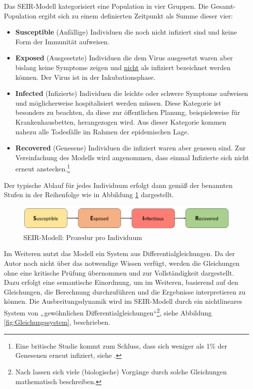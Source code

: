 \documentclass[12pt]{article}
\begin{document}
Das SEIR-Modell kategorisiert eine Population in vier Gruppen. Die Gesamt-Population ergibt sich zu einem definierten Zeitpunkt als Summe dieser vier:

\begin{itemize}
    \item \textbf{Susceptible} (Anfällige) Individuen die noch nicht infiziert sind und keine Form der Immunität aufweisen.
    \item \textbf{Exposed} (Ausgesetzte) Individuen die dem Virus ausgesetzt waren aber bislang keine Symptome zeigen und \underline{nicht} als infiziert bezeichnet werden können. Der Virus ist in der Inkubationsphase.
    \item \textbf{Infected} (Infizierte) Individuen die leichte oder schwere Symptome aufweisen und möglicherweise hospitalisiert werden müssen. Diese Kategorie ist besonders zu beachten, da diese zur öffentlichen Planung, beispielsweise für Krankenhausbetten, herangezogen wird. Aus dieser Kategorie kommen nahezu alle Todesfälle im Rahmen der epidemischen Lage.
    \item \textbf{Recovered} (Genesene) Individuen die infiziert waren aber genesen sind. Zur Vereinfachung des Modells wird angenommen, dass einmal Infizierte sich nicht erneut anstecken.\footnote{Eine britische Studie kommt zum Schluss, dass sich weniger als 1\% der Genesenen erneut infiziert, siehe \cite{mdrWissen}.}
\end{itemize}

Der typische Ablauf für jedes Individuum erfolgt dann gemäß der benannten Stufen in der Reihenfolge wie in Abbildung \ref{fig:SEIR_einfach} dargestellt.
\begin{figure}[H]
\centering
\includegraphics[scale=0.5]{SEIR_einfach}
\caption{SEIR-Modell: Prozedur pro Individuum}
\label{fig:SEIR_einfach}
\end{figure}

Im Weiteren nutzt das Modell ein System aus Differentialgleichungen. Da der Autor noch nicht über das notwendige Wissen verfügt, werden die Gleichungen ohne eine kritische Prüfung übernommen und zur Vollständigkeit dargestellt. Dazu erfolgt eine semantische Einordnung, um im Weiteren, basierend auf den Gleichungen, die Berechnung durchzuführen und die Ergebnisse interpretieren zu können. Die Ausbreitungsdynamik wird im SEIR-Modell durch ein nichtlineares System von „gewöhnlichen Differentialgleichungen“\footnote{Nach \cite{DiffGl} lassen sich viele (biologische) Vorgänge durch solche Gleichungen mathematisch beschreiben.}, siehe Abbildung \ref{fig:Gleichungssystem}, beschrieben.
\end{document}

